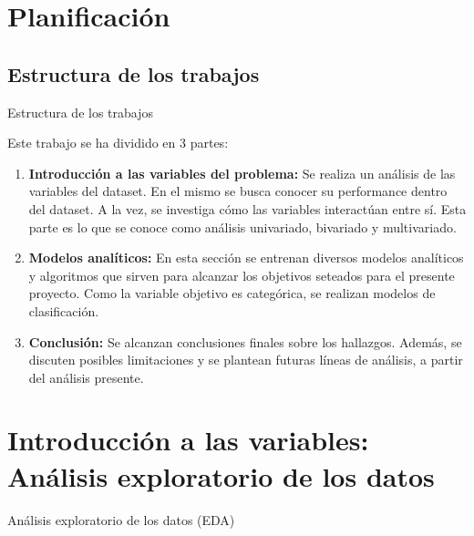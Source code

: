 \documentclass[pdf]{beamer}
\begin{document}
\section{Planificación}

    \subsection*{Estructura de los trabajos}

\begin{frame}{Estructura de los trabajos}

    Este trabajo se ha dividido en 3 partes:
    \begin{enumerate}
        \item \textbf{Introducción a las variables del problema:} Se realiza un análisis de las variables del dataset. En el mismo se busca conocer su performance dentro del dataset. A la vez, se investiga cómo las variables interactúan entre sí. Esta parte es lo que se conoce como análisis univariado, bivariado y multivariado.
        \item \textbf{Modelos analíticos:} En esta sección se entrenan diversos modelos analíticos y algoritmos que sirven para alcanzar los objetivos seteados para el presente proyecto. Como la variable objetivo es categórica, se realizan modelos de clasificación.
        \item \textbf{Conclusión:} Se alcanzan conclusiones finales sobre los hallazgos. Además, se discuten posibles limitaciones y se plantean futuras líneas de análisis, a partir del análisis presente.
    \end{enumerate}

\end{frame}

\section{Introducción a las variables: Análisis exploratorio de los datos}

\begin{frame}{Análisis exploratorio de los datos (EDA)}
    
\end{frame}
 
\end{document}
